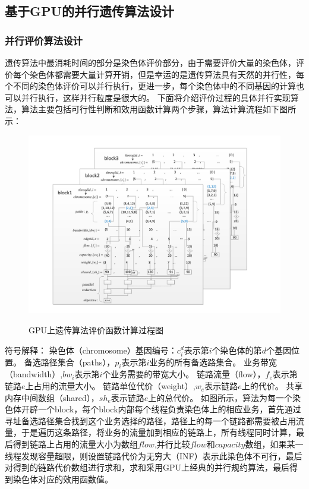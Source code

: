\subsection{基于GPU的并行遗传算法设计}
\subsubsection{并行评价算法设计}
  遗传算法中最消耗时间的部分是染色体评价部分，由于需要评价大量的染色体，评价每个染色体都需要大量计算开销，但是幸运的是遗传算法具有天然的并行性，每个不同的染色体评价可以并行执行，更进一步，每个染色体中的不同基因的计算也可以并行执行，这样并行粒度是很大的。
  下面将介绍评价过程的具体并行实现算法，算法主要包括可行性判断和效用函数计算两个步骤，算法计算流程如下图所示：
\begin{figure}
  \begin{center}
    {\includegraphics[width=1 \textwidth]{figures/GPUfitness.pdf}}
    \end{center}
  \caption{{\footnotesize{GPU上遗传算法评价函数计算过程图}}}
  \label{IterNum}
\end{figure}
符号解释：
染色体（chromosome）基因编号：$c^d_i$表示第$i$个染色体的第$d$个基因位置。
备选路径集合（paths），$p_i$表示第$i$业务的所有备选路集合。
业务带宽（bandwidth）,$bw_i$表示第$i$个业务需要的带宽大小。
链路流量（flow），$f_e$表示第链路$e$上占用的流量大小。
链路单位代价（weight）,$w_e$表示链路$e$上的代价。
共享内存中间数组（shared），$sh_e$表示链路$e$上的总代价。
  如图所示，算法为每一个染色体开辟一个block，每个block内部每个线程负责染色体上的相应业务，首先通过寻址备选路径集合找到这个业务选择的路径，路径上的每一个链路都需要被占用流量，于是遍历这条路径，将业务的流量加到相应的链路上，所有线程同时计算，最后得到链路上占用的流量大小为数组$flow$,并行比较$flow$和$capacity$数组，如果某一线程发现容量超限，则设置链路代价为无穷大（INF）表示此染色体不可行，最后对得到的链路代价数组进行求和，求和采用GPU上经典的并行规约算法，最后得到染色体对应的效用函数值。
